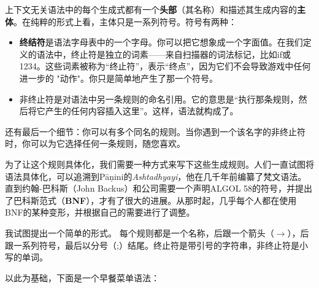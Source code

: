 \documentclass[cn,11pt,chinese]{elegantbook}
\begin{document}
上下文无关语法中的每个生成式都有一个\textbf{头部}（其名称）和描述其生成内容的\textbf{主体}。在纯粹的形式上看，主体只是一系列符号。符号有两种：

\begin{itemize}
  \item \textbf{终结符}是语法字母表中的一个字母。你可以把它想象成一个字面值。在我们定义的语法中，终止符是独立的词素——来自扫描器的词法标记，比如if或1234。这些词素被称为“终止符”，表示“终点”，因为它们不会导致游戏中任何进一步的 "动作"。你只是简单地产生了那一个符号。
  \item 非终止符是对语法中另一条规则的命名引用。它的意思是“执行那条规则，然后将它产生的任何内容插入这里”。这样，语法就构成了。
\end{itemize}

还有最后一个细节：你可以有多个同名的规则。当你遇到一个该名字的非终止符时，你可以为它选择任何一条规则，随您喜欢。

为了让这个规则具体化，我们需要一种方式来写下这些生成规则。人们一直试图将语法具体化，可以追溯到Pāṇini的\textit{Ashtadhyayi}，他在几千年前编纂了梵文语法。直到约翰-巴科斯（John Backus）和公司需要一个声明ALGOL 58的符号，并提出了巴科斯范式（\textbf{BNF}），才有了很大的进展。从那时起，几乎每个人都在使用BNF的某种变形，并根据自己的需要进行了调整。

我试图提出一个简单的形式。 每个规则都是一个名称，后跟一个箭头（$\rightarrow$），后跟一系列符号，最后以分号（;）结尾。终止符是带引号的字符串，非终止符是小写的单词。

以此为基础，下面是一个早餐菜单语法：
\end{document}
